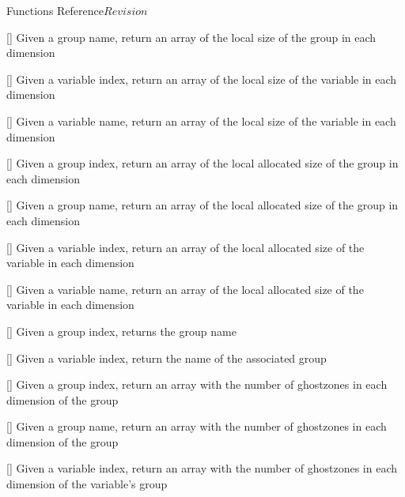\begin{cactuspart}{ Functions Reference}{}{$Revision$}
\begin{Lentry}
\item[\code{CCTK\_GrouplshGN}] [\pageref{CCTK-GrouplshGN}]
  Given a group name, return an array of the local size
  of the group in each dimension

\item[\code{CCTK\_GrouplshVI}] [\pageref{CCTK-GrouplshVI}]
  Given a variable index, return an array of the local size
  of the variable in each dimension

\item[\code{CCTK\_GrouplshVN}] [\pageref{CCTK-GrouplshVN}]
  Given a variable name, return an array of the local size
  of the variable in each dimension

\item[\code{CCTK\_GroupashGI}] [\pageref{CCTK-GroupashGI}]
  Given a group index, return an array of the local allocated size
  of the group in each dimension

\item[\code{CCTK\_GroupashGN}] [\pageref{CCTK-GroupashGN}]
  Given a group name, return an array of the local allocated size
  of the group in each dimension

\item[\code{CCTK\_GroupashVI}] [\pageref{CCTK-GroupashVI}]
  Given a variable index, return an array of the local allocated size
  of the variable in each dimension

\item[\code{CCTK\_GroupashVN}] [\pageref{CCTK-GroupashVN}]
  Given a variable name, return an array of the local allocated size
  of the variable in each dimension

\item[\code{CCTK\_GroupName}] [\pageref{CCTK-GroupName}]
  Given a group index, returns the group name

\item[\code{CCTK\_GroupNameFromVarI}] [\pageref{CCTK-GroupNameFromVarI}]
  Given a variable index, return the name of the associated group

\item[\code{CCTK\_GroupnghostzonesGI}] [\pageref{CCTK-GroupnghostzonesGI}]
  Given a group index, return an array with the number of ghostzones
  in each dimension of the group

\item[\code{CCTK\_GroupnghostzonesGN}] [\pageref{CCTK-GroupnghostzonesGN}]
  Given a group name, return an array with the number of ghostzones
  in each dimension of the group

\item[\code{CCTK\_GroupnghostzonesVI}] [\pageref{CCTK-GroupnghostzonesVI}]
  Given a variable index, return an array with the number of ghostzones
  in each dimension of the variable's group


\end{Lentry}
\end{cactuspart}
